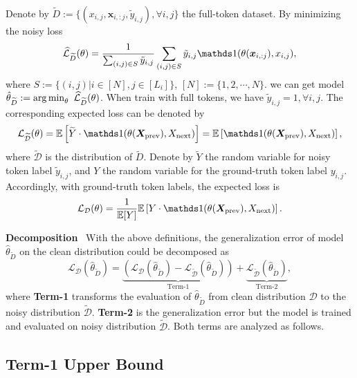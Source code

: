 Denote by $\widetilde D:=\{(x_{i,j}, \bm x_{i,:j}, \tilde y_{i,j}), \forall i,j\}$ the full-token dataset.
By minimizing the noisy loss
$$
    \widehat {\mathcal{L}}_{\widetilde D}(\theta) =   \frac{1}{\sum_{(i,j)\in S} \tilde y_{i,j}} \sum_{(i,j)\in S} \tilde y_{i,j} \BR( \theta (\bm x_{i,:j}), x_{i,j}),
$$
where $S:=\{(i,j) | i\in [N], j\in [L_i]\}$, $[N]:=\{1, 2,\cdots, N\}$.
we can get model $\hat \theta_{\widetilde D}:=\operatorname*{arg\,min}_{\theta}~  \widehat {\mathcal{L}}_{\widetilde D}(\theta)$. When train with full tokens, we have $\tilde y_{i,j}=1, \forall i,j$. The corresponding expected loss can be denoted by 
$$
{\mathcal{L}}_{\widetilde {\mathcal D}}(\theta) = \E\left[ \widetilde Y \cdot \BR{(\theta(\bm X_{\text{prev}}), X_{\text{next}})}  \right] = \E\left[  \BR{(\theta(\bm X_{\text{prev}}), X_{\text{next}})}  \right],
$$
where $\widetilde {\mathcal D}$ is the distribution of $\widetilde D$. Denote by $\widetilde Y$ the random variable for noisy token label $\tilde y_{i,j}$, and $Y$ the random variable for the ground-truth token label $y_{i,j}$. Accordingly, with ground-truth token labels, the expected loss is
$$
{\mathcal{L}}_{{\mathcal D}}(\theta) = \frac{1}{\E[Y]} \E\left[ Y \cdot \BR{(\theta(\bm X_{\text{prev}}), X_{\text{next}})}  \right].
$$







\textbf{Decomposition}~
With the above definitions, the generalization error of model $\hat \theta_{\widetilde D}$ on the clean distribution could be decomposed as $${\mathcal L}_{{\mathcal D}}(\hat \theta_{\widetilde D})=  
\underbrace{({\mathcal L}_{{\mathcal D}}(\hat \theta_{\widetilde D}) - {\mathcal L}_{\widetilde{\mathcal D}}(\hat \theta_{\widetilde D})) }_{\text{Term-1}}
+\underbrace{{\mathcal L}_{\widetilde{\mathcal D}}(\hat \theta_{\widetilde D}) }_{\text{Term-2}},$$
where {\bf Term-1} 
transforms the evaluation of $\hat \theta_{\widetilde D}$ from clean distribution $\mathcal D$ to the noisy distribution $\widetilde{\mathcal D}$. {\bf Term-2} 
is the generalization error but the model is trained and evaluated on noisy distribution $\widetilde{\mathcal D}$.
Both terms are analyzed as follows.

\subsection{Term-1 Upper Bound}

